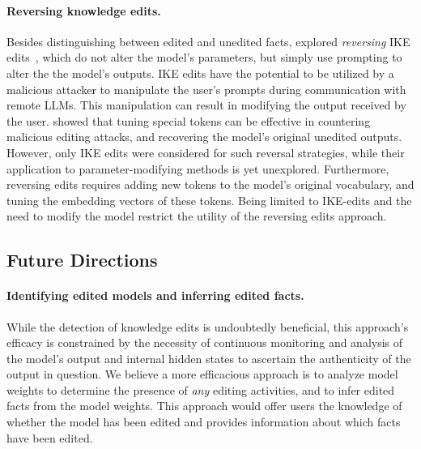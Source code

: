 \paragraph{Reversing knowledge edits.} Besides distinguishing between edited and unedited facts, \citet{youssef-etal-2024-reverse} explored \emph{reversing} IKE edits~\cite{zheng-etal-2023-edit}, which do not alter the model's parameters, but simply use prompting to alter the the model's outputs. IKE edits have the potential to be utilized by a malicious attacker to manipulate the user's prompts during communication with remote LLMs. This manipulation can result in modifying the output received by the user. \citet{youssef-etal-2024-reverse} showed that tuning special tokens can be effective in countering malicious editing attacks, and recovering the model's original unedited outputs. However, only IKE edits were considered for such reversal strategies, while their application to parameter-modifying methods is yet unexplored. Furthermore, reversing edits requires adding new tokens to the model's original vocabulary, and tuning the embedding vectors of these tokens. Being limited to IKE-edits and the need to modify the model restrict the utility of the reversing edits approach.











\subsection{Future Directions}
\label{subsec:future_work}





\paragraph{Identifying edited models and inferring edited facts.} 
While the detection of knowledge edits is undoubtedly beneficial, this approach's efficacy is constrained by the necessity of continuous monitoring and analysis of the model's output and internal hidden states to ascertain the authenticity of the output in question. We believe a more efficacious approach is to analyze model weights to determine the presence of \emph{any} editing activities, and to infer edited facts from the model weights. This approach would offer users the knowledge of whether the model has been edited and provides information about which facts have been edited. %











